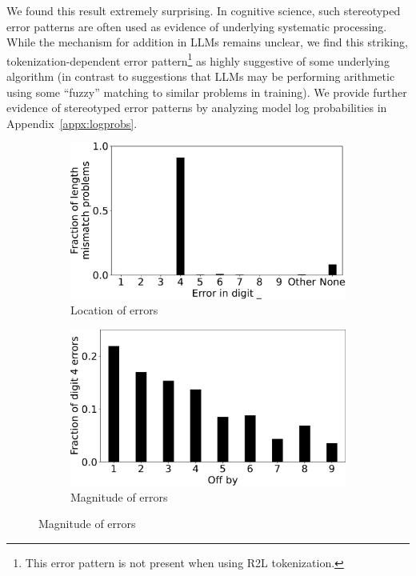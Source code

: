 \documentclass{article}
\theoremstyle{plain}
\theoremstyle{definition}
\theoremstyle{remark}
\begin{document}
We found this result extremely surprising. In cognitive science, such stereotyped error patterns are often used as evidence of underlying systematic processing. While the mechanism for addition in LLMs remains unclear, we find this striking, tokenization-dependent error pattern\footnote{This error pattern is not present when using R2L tokenization.} as highly suggestive of some underlying algorithm (in contrast to suggestions that LLMs may be performing arithmetic using some ``fuzzy'' matching to similar problems in training). We provide further evidence of stereotyped error patterns by analyzing model log probabilities in Appendix~\ref{appx:logprobs}.

\begin{figure}[ht]
    \centering
    \vspace{-0.5em}
    \begin{subfigure}[t]{0.95\columnwidth}
        \caption{Location of errors}
        \includegraphics[width=0.95\columnwidth]{figures/len_mismatch_nosep_digit4.pdf}
    \end{subfigure}
    \begin{subfigure}[t]{0.96\columnwidth}
        \vspace{-0.3em}
        \caption{Magnitude of errors}
        \includegraphics[width=0.95\columnwidth]{figures/len_mismatch_nosep_digit4_offby.pdf}

\end{subfigure}
\end{figure}
\end{document}
